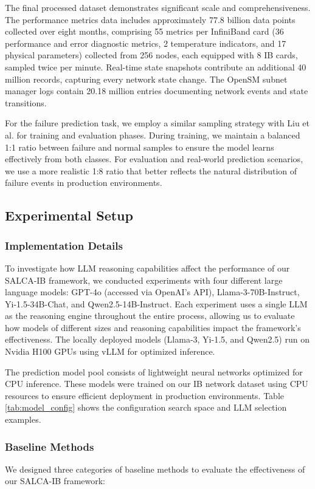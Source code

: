 \documentclass[conference]{IEEEtran}
\begin{document}
The final processed dataset demonstrates significant scale and comprehensiveness. The performance metrics data includes approximately 77.8 billion data points collected over eight months, comprising 55 metrics per InfiniBand card (36 performance and error diagnostic metrics, 2 temperature indicators, and 17 physical parameters) collected from 256 nodes, each equipped with 8 IB cards, sampled twice per minute. Real-time state snapshots contribute an additional 40 million records, capturing every network state change. The OpenSM subnet manager logs contain 20.18 million entries documenting network events and state transitions. 

For the failure prediction task, we employ a similar sampling strategy with Liu et al. \cite{b8} for training and evaluation phases. During training, we maintain a balanced 1:1 ratio between failure and normal samples to ensure the model learns effectively from both classes. For evaluation and real-world prediction scenarios, we use a more realistic 1:8 ratio that better reflects the natural distribution of failure events in production environments. 


\subsection{Experimental Setup}

\subsubsection{Implementation Details}
To investigate how LLM reasoning capabilities affect the performance of our SALCA-IB framework, we conducted experiments with four different large language models: GPT-4o (accessed via OpenAI's API), Llama-3-70B-Instruct, Yi-1.5-34B-Chat, and Qwen2.5-14B-Instruct. Each experiment uses a single LLM as the reasoning engine throughout the entire process, allowing us to evaluate how models of different sizes and reasoning capabilities impact the framework's effectiveness. The locally deployed models (Llama-3, Yi-1.5, and Qwen2.5) run on Nvidia H100 GPUs using vLLM for optimized inference.

The prediction model pool consists of lightweight neural networks optimized for CPU inference. These models were trained on our IB network dataset using CPU resources to ensure efficient deployment in production environments. Table \ref{tab:model_config} shows the configuration search space and LLM selection examples.

\subsubsection{Baseline Methods}
We designed three categories of baseline methods to evaluate the effectiveness of our SALCA-IB framework:
\end{document}
